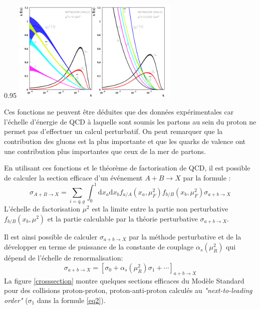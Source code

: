 \begin{minipagewithmarginpars}[ht!]{0.95\textwidth}
	\centering
	\includegraphics[width=0.6\textwidth]{LHC/pdf.png}
	\label{pdf}	
\end{minipagewithmarginpars}
 
Ces fonctions ne peuvent être déduites que des données expérimentales car l'échelle d'énergie de QCD à laquelle sont soumis les partons au sein du proton ne permet pas d'effectuer un calcul perturbatif. On peut remarquer que la contribution des gluons est la plus importante et que les quarks de valence ont une contribution plus importantes que ceux de la mer de partons.

En utilisant ces fonctions et le théorème de factorisation de QCD, il est possible de calculer la section efficace d'un événement $A+B\rightarrow X$ par la formule :
\begin{equation}
\sigma_{A+B\rightarrow X}=\sum_{i=q,g}\int_{0}^{1} \mathrm{d}x_{a}\mathrm{d}x_{b}f_{a/A}(x_{a},\mu_{F}^{2})f_{b/B}(x_{b},\mu_{F}^{2})\sigma{_{a+b\rightarrow X}}
\end{equation}
L'échelle de factorisation $\mu^{2}$ est la limite entre la partie non perturbative $f_{b/B}(x_{b},\mu^{2})$ et la partie calculable par la théorie perturbative $\sigma{_{a+b\rightarrow X}}$.

Il est ainsi possible de calculer $\sigma{_{a+b\rightarrow X}}$ par la méthode perturbative et de la développer en terme de puissance de la constante de couplage $\alpha_{s}\left(\mu_{R}^{2}\right)$ qui dépend de l'échelle de renormalisation:
\begin{equation}
\sigma_{a+b\rightarrow X}=\left[\sigma_{0}+\alpha_{s}\left(\mu_{R}^{2}\right)\sigma_{1}+\cdots\right]_{a+b\rightarrow X}
\label{eq2}
\end{equation}
La figure \ref{crosssection} montre quelques sections efficaces du Modèle Standard pour des collisions proton-proton, proton-anti-proton calculés au \textit{"next-to-leading order"} ($\sigma_{1}$ dans la formule \ref{eq2}).

